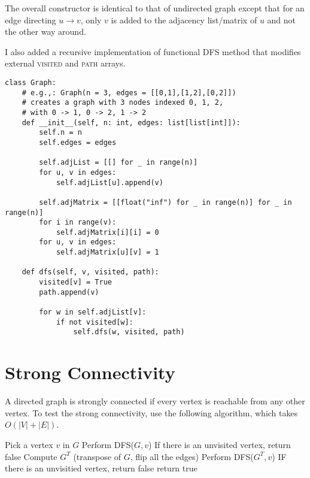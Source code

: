 
\noindent The overall constructor is identical to that of undirected graph except that for an edge directing $u \rightarrow v$, only $v$ is added to the adjacency list/matrix of $u$ and not the other way around.

\noindent I also added a recursive implementation of functional \textsc{DFS} method that modifies external \textsc{visited} and \textsc{path} arrays.

\begin{verbatim}
class Graph:
    # e.g.,: Graph(n = 3, edges = [[0,1],[1,2],[0,2]])
    # creates a graph with 3 nodes indexed 0, 1, 2,
    # with 0 -> 1, 0 -> 2, 1 -> 2
    def __init__(self, n: int, edges: list[list[int]]):
        self.n = n
        self.edges = edges

        self.adjList = [[] for _ in range(n)]
        for u, v in edges:
            self.adjList[u].append(v)

        self.adjMatrix = [[float("inf") for _ in range(n)] for _ in range(n)]
        for i in range(v):
            self.adjMatrix[i][i] = 0
        for u, v in edges:
            self.adjMatrix[u][v] = 1

    def dfs(self, v, visited, path):
        visited[v] = True
        path.append(v)

        for w in self.adjList[v]:
            if not visited[w]:
                self.dfs(w, visited, path)
\end{verbatim}

\section{Strong Connectivity}

A directed graph is strongly connected if every vertex is reachable from any other vertex.
To test the strong connectivity, use the following algorithm, which takes $O(|V| + |E|)$.

\noindent \hrulefill
\begin{algorithmic}[1]
    \State Pick a vertex $v$ in $G$
    \State Perform \textsc{DFS($G, v$)}
    \State If there is an unvisited vertex, return false
    \State Compute $G^T$ (transpose of $G$, flip all the edges)
    \State Perform \textsc{DFS($G^T, v$)}
    \State IF there is an unvisitied vertex, return false
    \State return true
  \EndFunction
\end{algorithmic}
\noindent \hrulefill

